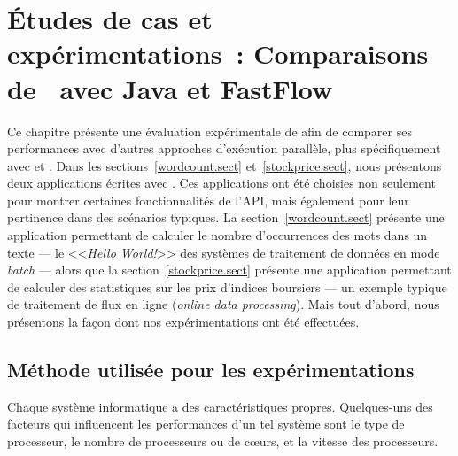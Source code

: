 
\chapter{\'Etudes de cas et exp\'erimentations~: Comparaisons de \ppff\ avec Java et FastFlow}
\label{experiences.chap}


Ce chapitre pr\'esente une \'evaluation exp\'erimentale de  afin de comparer ses performances avec d'autres approches d'ex\'ecution parall\`ele, plus sp\'ecifiquement avec  et .
%
Dans les sections~\ref{wordcount.sect} et~\ref{stockprice.sect}, nous pr\'esentons deux applications \'ecrites avec \PpFf. Ces applications ont \'et\'e choisies non seulement pour montrer certaines fonctionnalit\'es de l'API, mais \'egalement pour leur pertinence dans des sc\'enarios typiques. La section~\ref{wordcount.sect} pr\'esente une application permettant de calculer le nombre d'occurrences des mots dans un texte --- le <<\emph{Hello World!}>> des syst\`emes de traitement de donn\'ees en mode \emph{batch} --- alors que la section~\ref{stockprice.sect} pr\'esente une application permettant de calculer des statistiques sur les prix d'indices boursiers --- un exemple typique de traitement de flux en ligne (\emph{online data processing}). Mais tout d'abord, nous pr\'esentons la fa\c{c}on dont nos exp\'erimentations ont \'et\'e effectu\'ees.




\section{M\'ethode utilis\'ee pour les exp\'erimentations}
\label{usedMethodsForBenchmarks.chap}

Chaque syst\`eme informatique a des caract\'eristiques propres. Quelques-uns des facteurs qui influencent les performances d'un tel syst\`eme sont le type de processeur, le nombre de processeurs ou de c\oe{}urs, et la vitesse des processeurs. 



